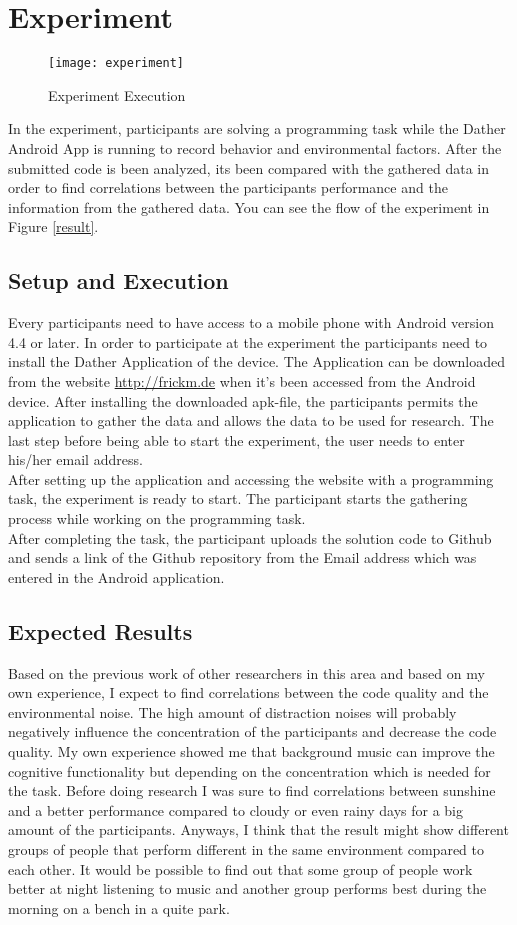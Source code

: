 \chapter{Experiment}


\begin{figure}
\texttt{[image: experiment]}
\caption{Experiment Execution}\label{experiment}
\vspace{10 mm}
\end{figure}

In the experiment, participants are solving a programming task while the Dather Android App is running to record behavior and environmental factors. After the submitted code is been analyzed, its been compared with the gathered data in order to find correlations between the participants performance and the information from the gathered data. You can see the flow of the experiment in Figure \ref{result}. 
\section{Setup and Execution}
Every participants need to have access to a mobile phone with Android version 4.4 or later. In order to participate at the experiment the participants need to install the Dather Application of the device. The Application can be downloaded from the website \url{http://frickm.de} when it's been accessed from the Android device. 
After installing the downloaded apk-file, the participants permits the application to gather the data and allows the data to be used for research. 
The last step before being able to start the experiment, the user needs to enter his/her email address.\\
After setting up the application and accessing the website with a programming task, the experiment is ready to start. The participant starts the gathering process while working on the programming task.\\
After completing the task, the participant uploads the solution code to Github and sends a link of the Github repository from the Email address which was entered in the Android application. 

\section{Expected Results}
Based on the previous work of other researchers in this area and based on my own experience, I expect to find correlations between the code quality and the environmental noise. The high amount of distraction noises will probably negatively influence the concentration of the participants and decrease the code quality. My own experience showed me that background music can improve the cognitive functionality but depending on the concentration which is needed for the task. Before doing research I was sure to find correlations between sunshine and a better performance compared to cloudy or even rainy days for a big amount of the participants. Anyways, I think that the result might show different groups of people that perform different in the same environment compared to each other. It would be possible to find out that some group of people work better at night listening to music and another group performs best during the morning on a bench in a quite park.
